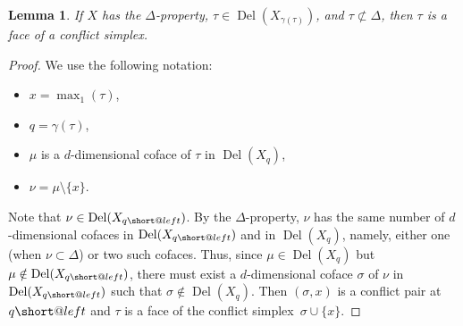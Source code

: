 \documentclass[11pt]{amsart}
\makeatletter
\DeclareMathOperator{\DelT}{Del}
\DeclareRobustCommand{\subleft}{%
  \mathrel{\mathpalette\short@left\relax}%
}
\newcommand{\short@left}[2]{%
  \mkern2mu
  \clipbox{0 0 {.35\width} 0}{$\m@th#1\vphantom{+}{\leftarrow}$}%
  }
\theoremstyle{plain}
\newtheorem{lemma}[theorem]{Lemma}
\theoremstyle{definition}
\theoremstyle{remark}
\makeatother
\begin{document}
%
%
\begin{lemma}\label{Lem:Conflict_Technicality_2}
If $X$ has the $\Delta$-property, $\tau\in \DelT(X_{\gamma(\tau)})$, and $\tau\not \subset \Delta$, then $\tau$ is a face of a conflict simplex.
\end{lemma}
%
\begin{proof}
We use the following notation:
\begin{itemize}
\item $x=\max_1(\tau)$, 
\item $q=\gamma(\tau)$, 
\item $\mu$ is a $d$-dimensional coface of $\tau$ in $\DelT(X_{q})$,
\item $\nu=\mu\setminus \{x\}$.  
\end{itemize}
Note that $\nu\in \DelT(X_{q{\subleft}})$.   By the $\Delta$-property, $\nu$ has the same number of $d$-dimensional cofaces in $\DelT(X_{q{\subleft}})$ and in $\DelT(X_{q})$, namely, either one (when $\nu\subset \Delta$) or two such cofaces.  Thus, since $\mu\in \DelT(X_{q})$ but $\mu\notin \DelT(X_{q{\subleft}})$, there must exist a $d$-dimensional coface $\sigma$ of $\nu$ in $\DelT(X_{q{\subleft}})$ such that $\sigma \notin \DelT(X_{q})$.  Then $(\sigma, x)$ is a conflict pair at $q{\subleft}$ and $\tau$ is a face of the conflict simplex~$\sigma\cup\{x\}$.   
\end{proof}
%
%
\end{document}
